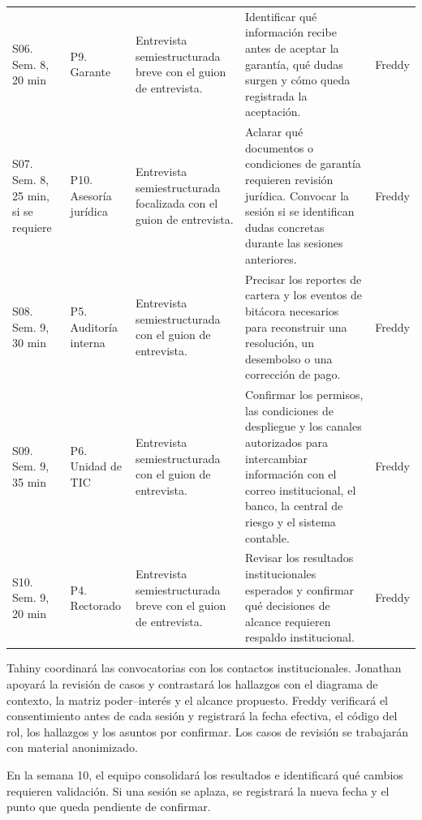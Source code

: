 \documentclass[11pt,a4paper]{article}
\begin{document}
\begin{longtable}{@{}L{.12}L{.19}L{.20}L{.30}L{.10}@{}}
S06. Sem. 8, 20 min
& P9. Garante
& Entrevista semiestructurada breve con el guion de entrevista.
& Identificar qué información recibe antes de aceptar la garantía,
qué dudas surgen y cómo queda registrada la aceptación.
& Freddy \\
\addlinespace

S07. Sem. 8, 25 min, si se requiere
& P10. Asesoría jurídica
& Entrevista semiestructurada focalizada con el guion de entrevista.
& Aclarar qué documentos o condiciones de garantía requieren
revisión jurídica. Convocar la sesión si se identifican dudas
concretas durante las sesiones anteriores.
& Freddy \\
\addlinespace

S08. Sem. 9, 30 min
& P5. Auditoría interna
& Entrevista semiestructurada con el guion de entrevista.
& Precisar los reportes de cartera y los eventos de bitácora
necesarios para reconstruir una resolución, un desembolso
o una corrección de pago.
& Freddy \\
\addlinespace

S09. Sem. 9, 35 min
& P6. Unidad de TIC
& Entrevista semiestructurada con el guion de entrevista.
& Confirmar los permisos, las condiciones de despliegue y los
canales autorizados para intercambiar información con el correo
institucional, el banco, la central de riesgo y el sistema contable.
& Freddy \\
\addlinespace

S10. Sem. 9, 20 min
& P4. Rectorado
& Entrevista semiestructurada breve con el guion de entrevista.
& Revisar los resultados institucionales esperados y confirmar
qué decisiones de alcance requieren respaldo institucional.
& Freddy \\

\end{longtable}
\endgroup

Tahiny coordinará las convocatorias con los contactos institucionales.
Jonathan apoyará la revisión de casos y contrastará los hallazgos con
el diagrama de contexto, la matriz poder--interés y el alcance
propuesto. Freddy verificará el consentimiento antes de cada sesión
y registrará la fecha efectiva, el código del rol, los hallazgos y
los asuntos por confirmar. Los casos de revisión se trabajarán con
material anonimizado.

En la semana 10, el equipo consolidará los resultados e identificará
qué cambios requieren validación. Si una sesión se aplaza, se
registrará la nueva fecha y el punto que queda pendiente de confirmar.
\end{document}
